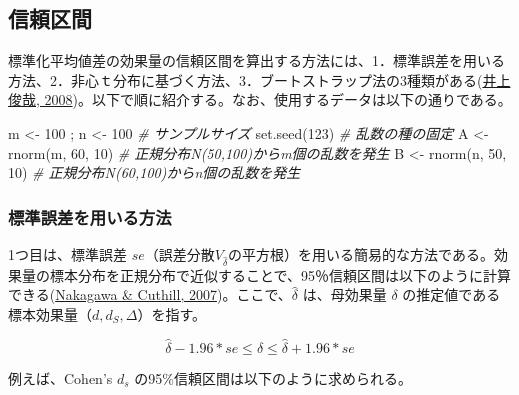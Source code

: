 \documentclass[
  ja=standard, xelatex, base=12pt]{bxjsreport}
\newenvironment{Shaded}{\begin{snugshade}}{\end{snugshade}}
\newcommand{\CommentTok}[1]{\textcolor[rgb]{0.56,0.35,0.01}{\textit{#1}}}
\newcommand{\DecValTok}[1]{\textcolor[rgb]{0.00,0.00,0.81}{#1}}
\newcommand{\FunctionTok}[1]{\textcolor[rgb]{0.00,0.00,0.00}{#1}}
\newcommand{\NormalTok}[1]{#1}
\newcommand{\OtherTok}[1]{\textcolor[rgb]{0.56,0.35,0.01}{#1}}
\begin{document}
\hypertarget{ux4fe1ux983cux533aux9593-2}{%
\subsection{信頼区間}\label{ux4fe1ux983cux533aux9593-2}}

標準化平均値差の効果量の信頼区間を算出する方法には、1．標準誤差を用いる方法、2．非心ｔ分布に基づく方法、3．ブートストラップ法の3種類がある(\protect\hyperlink{ref-inoue2008}{井上俊哉, 2008})。以下で順に紹介する。なお、使用するデータは以下の通りである。

\begin{Shaded}
\begin{Highlighting}[]
\NormalTok{m }\OtherTok{\textless{}{-}} \DecValTok{100}\NormalTok{ ; n }\OtherTok{\textless{}{-}} \DecValTok{100}   \CommentTok{\# サンプルサイズ}
\FunctionTok{set.seed}\NormalTok{(}\DecValTok{123}\NormalTok{)         }\CommentTok{\# 乱数の種の固定}
\NormalTok{A }\OtherTok{\textless{}{-}} \FunctionTok{rnorm}\NormalTok{(m, }\DecValTok{60}\NormalTok{, }\DecValTok{10}\NormalTok{) }\CommentTok{\# 正規分布N(50,100)からm個の乱数を発生}
\NormalTok{B }\OtherTok{\textless{}{-}} \FunctionTok{rnorm}\NormalTok{(n, }\DecValTok{50}\NormalTok{, }\DecValTok{10}\NormalTok{) }\CommentTok{\# 正規分布N(60,100)からn個の乱数を発生}
\end{Highlighting}
\end{Shaded}

\hypertarget{ux6a19ux6e96ux8aa4ux5deeux3092ux7528ux3044ux308bux65b9ux6cd5-1}{%
\subsubsection{標準誤差を用いる方法}\label{ux6a19ux6e96ux8aa4ux5deeux3092ux7528ux3044ux308bux65b9ux6cd5-1}}

1つ目は、標準誤差 \(se\)（誤差分散\(V_{\hat\delta}\)の平方根）を用いる簡易的な方法である。効果量の標本分布を正規分布で近似することで、95％信頼区間は以下のように計算できる(\protect\hyperlink{ref-nakagawa2007}{Nakagawa \& Cuthill, 2007})。ここで、\(\hat\delta\) は、母効果量 \(\delta\) の推定値である標本効果量（\(d, d_S, \Delta\)）を指す。

\[
\hat{\delta}-1.96*se\leq\delta\leq\hat{\delta}+1.96*se
\]

例えば、Cohen's \(d_s\) の95\%信頼区間は以下のように求められる。
\end{document}
